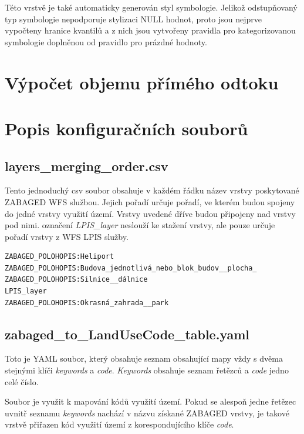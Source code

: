 \documentclass[a4paper,oneside,12pt]{book}
\begin{document}
\hspace{10mm}Této vrstvě je také automaticky generován styl symbologie. Jelikož odstupňovaný typ symbologie nepodporuje stylizaci NULL hodnot, proto jsou nejprve vypočteny hranice kvantilů a z nich jsou vytvořeny pravidla pro kategorizovanou symbologie doplněnou od pravidlo pro prázdné hodnoty.

\section{Výpočet objemu přímého odtoku} \label{runoff}
\section{Popis konfiguračních souborů} \label{config}
\subsection{layers\_merging\_order.csv} \label{layers_merging_order.csv}
\hspace{10mm}Tento jednoduchý csv soubor obsahuje v každém řádku název vrstvy poskytované ZABAGED WFS službou. Jejich pořadí určuje pořadí, ve kterém budou spojeny do jedné vrstvy využití území. Vrstvy uvedené dříve budou připojeny nad vrstvy pod nimi. označení \textit{LPIS\_layer} neslouží ke stažení vrstvy, ale pouze určuje pořadí vrstvy z WFS LPIS služby.

\begin{lstlisting}[style=mypython, caption={Ukázka layers\_merging\_order.csv},label={kod:layers_merging_order.csv}]
ZABAGED_POLOHOPIS:Heliport
ZABAGED_POLOHOPIS:Budova_jednotlivá_nebo_blok_budov__plocha_
ZABAGED_POLOHOPIS:Silnice__dálnice
LPIS_layer
ZABAGED_POLOHOPIS:Okrasná_zahrada__park
\end{lstlisting}

\subsection{zabaged\_to\_LandUseCode\_table.yaml} \label{zabaged_to_LandUseCode_table.yaml}
\hspace{10mm}Toto je YAML soubor, který obsahuje seznam obsahující mapy vždy s dvěma stejnými klíči \textit{keywords} a \textit{code}. \textit{Keywords} obsahuje seznam řetězců a \textit{code} jedno celé číslo.

\hspace{10mm}Soubor je využit k mapování kódů využití území. Pokud se alespoň jedne řetězec uvnitř seznamu \textit{keywords} nachází v názvu získané ZABAGED vrstvy, je takové vrstvě přiřazen kód využití území z korespondujícího klíče \textit{code}.
\end{document}
